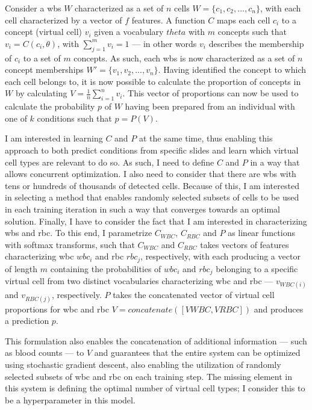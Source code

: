 Consider a \ac{wbs} $W$ characterized as a set of $n$ cells $W=\{c_1,c_2,...,c_n\}$, with each cell characterized by a vector of $f$ features. A function $C$ maps each cell $c_i$ to a concept (virtual cell) $v_i$ given a vocabulary $theta$ with $m$ concepts such that $v_i = C(c_i,\theta)$, with $\sum_{j=1}^m{v_i} = 1$ --- in other words $v_i$ describes the membership of $c_i$ to a set of $m$ concepts. As such, each \ac{wbs} is now characterized as a set of $n$ concept memberships $W'=\{v_1,v_2,...,v_n\}$. Having identified the concept to which each cell belongs to, it is now possible to calculate the proportion of concepts in $W$ by calculating $V = \frac{1}{n}\sum_{i=1}^n{v_i}$. This vector of proportions can now be used to calculate the probability $p$ of $W$ having been prepared from an individual with one of $k$ conditions such that $p = P(V)$.

I am interested in learning $C$ and $P$ at the same time, thus enabling this approach to both predict conditions from specific slides and learn which virtual cell types are relevant to do so. As such, I need to define $C$ and $P$ in a way that allows concurrent optimization. I also need to consider that there are \ac{wbs} with tens or hundreds of thousands of detected  cells. Because of this, I am interested in selecting a method that enables randomly selected subsets of cells to be used in each training iteration in such a way that converges towards an optimal solution.  Finally, I have to consider the fact that I am interested in characterizing \ac{wbs} and \ac{rbc}. To this end, I parametrize $C_{WBC}$, $C_{RBC}$ and $P$ as linear functions with softmax transforms, such that $C_{WBC}$ and $C_{RBC}$ takes vectors of features characterizing \ac{wbc} $wbc_i$ and \ac{rbc} $rbc_j$, respectively, with each producing a vector of length $m$ containing the probabilities of $wbc_i$ and $rbc_j$ belonging to a specific virtual cell from two distinct vocabularies characterizing \ac{wbc} and \ac{rbc} --- $v_{WBC(i)}$ and $v_{RBC(j)}$, respectively. $P$ takes the concatenated vector of virtual cell proportions for \ac{wbc} and \ac{rbc} $V=concatenate([VWBC,VRBC])$ and produces a prediction $p$. 

This formulation also enables the concatenation of additional information --- such as blood counts --- to $V$ and guarantees that the entire system can be optimized using stochastic gradient descent, also enabling the utilization of randomly selected subsets of \ac{wbc} and \ac{rbc} on each training step. The missing element in this system is defining the optimal number of virtual cell types; I consider this to be a hyperparameter in this model.

